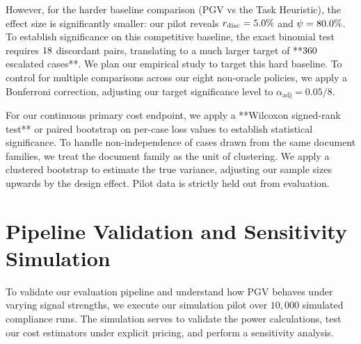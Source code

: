 \documentclass[manuscript,screen,nonacm]{acmart}
\begin{document}
However, for the harder baseline comparison (PGV vs the Task Heuristic), the effect size is significantly smaller: our pilot reveals $r_{\text{disc}} = 5.0\%$ and $\psi = 80.0\%$. To establish significance on this competitive baseline, the exact binomial test requires $18$ discordant pairs, translating to a much larger target of **$360$ escalated cases**. We plan our empirical study to target this hard baseline. To control for multiple comparisons across our eight non-oracle policies, we apply a Bonferroni correction, adjusting our target significance level to $\alpha_{\text{adj}} = 0.05/8$.

For our continuous primary cost endpoint, we apply a **Wilcoxon signed-rank test** or paired bootstrap on per-case loss values to establish statistical significance. To handle non-independence of cases drawn from the same document families, we treat the document family as the unit of clustering. We apply a clustered bootstrap to estimate the true variance, adjusting our sample sizes upwards by the design effect. Pilot data is strictly held out from evaluation.

\section{Pipeline Validation and Sensitivity Simulation}
\label{sec:results}

To validate our evaluation pipeline and understand how PGV behaves under varying signal strengths, we execute our simulation pilot over $10,000$ simulated compliance runs. The simulation serves to validate the power calculations, test our cost estimators under explicit pricing, and perform a sensitivity analysis.
\end{document}
